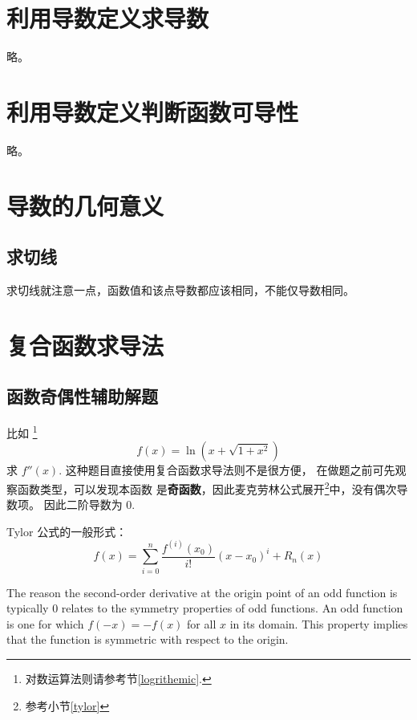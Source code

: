 \section{利用导数定义求导数}

略。

\section{利用导数定义判断函数可导性}

略。

\section{导数的几何意义}

\subsection{求切线}

求切线就注意一点，函数值和该点导数都应该相同，不能仅导数相同。

\section{复合函数求导法}

\subsection{函数奇偶性辅助解题}

比如
\footnote{ 对数运算法则请参考节\ref{logrithemic}. }
\[
    f(x) = \ln \left(x+\sqrt{1+x^2}\right)
\]
求 $f''(x)$.
这种题目直接使用复合函数求导法则不是很方便，
在做题之前可先观察函数类型，可以发现本函数
是\textbf{奇函数}，因此麦克劳林公式展开\footnote{参考小节\ref{tylor}}中，没有偶次导数项。
因此二阶导数为 0.

Tylor 公式的一般形式：
\begin{equation*}
    f(x)=\sum_{i=0}^{n}{\frac{f^{(i)}(x_0)}{i!}(x-x_0)^i}+R_n(x)
\end{equation*}

The reason the second-order derivative at the origin point of an odd function is typically 0 relates to the symmetry properties of odd functions. An odd function is one for which $f(-x) = -f(x)$ for all $x$ in its domain. This property implies that the function is symmetric with respect to the origin.

